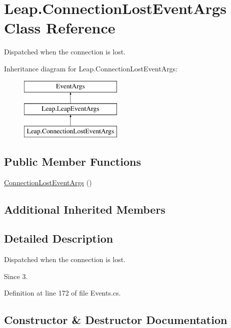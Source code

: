 \hypertarget{class_leap_1_1_connection_lost_event_args}{}\section{Leap.\+Connection\+Lost\+Event\+Args Class Reference}
\label{class_leap_1_1_connection_lost_event_args}


Dispatched when the connection is lost.  


Inheritance diagram for Leap.\+Connection\+Lost\+Event\+Args\+:\begin{figure}[H]
\begin{center}
\leavevmode
\includegraphics[height=3.000000cm]{class_leap_1_1_connection_lost_event_args}
\end{center}
\end{figure}
\subsection*{Public Member Functions}
\begin{DoxyCompactItemize}
\item 
\mbox{\hyperlink{class_leap_1_1_connection_lost_event_args_a3c6140ca62465eab4f693bef0de596ee}{Connection\+Lost\+Event\+Args}} ()
\end{DoxyCompactItemize}
\subsection*{Additional Inherited Members}


\subsection{Detailed Description}
Dispatched when the connection is lost. 

\begin{DoxySince}{Since}
3. 
\end{DoxySince}


Definition at line 172 of file Events.\+cs.



\subsection{Constructor \& Destructor Documentation}
\mbox{\label{class_leap_1_1_connection_lost_event_args_a3c6140ca62465eab4f693bef0de596ee}} 
